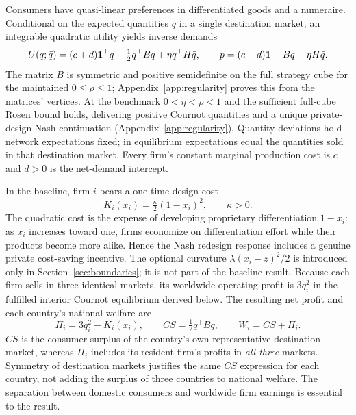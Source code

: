 \documentclass[11pt,a4paper]{article}
\theoremstyle{remark}\newtheorem{remark}[theorem]{Remark}
\begin{document}
Consumers have quasi-linear preferences in differentiated goods and a numeraire. Conditional on the expected quantities $\bar q$ in a single destination market, an integrable quadratic utility yields inverse demands
\begin{equation}\label{eq:consumer}
U(q;\bar q)=(c+d)\boldsymbol{1}^{\top}q-\tfrac12q^{\top}Bq+\eta q^{\top}H\bar q,\qquad
p=(c+d)\boldsymbol{1}-Bq+\eta H\bar q.
\end{equation}
The matrix $B$ is symmetric and positive semidefinite on the full strategy cube for the maintained $0\le\rho\le1$; Appendix~\ref{app:regularity} proves this from the matrices' vertices. At the benchmark $0<\eta<\rho<1$ and the sufficient full-cube Rosen bound holds, delivering positive Cournot quantities and a unique private-design Nash continuation (Appendix~\ref{app:regularity}). Quantity deviations hold network expectations fixed; in equilibrium expectations equal the quantities sold in that destination market. Every firm's constant marginal production cost is $c$ and $d>0$ is the net-demand intercept.

In the baseline, firm $i$ bears a one-time design cost
\begin{equation}\label{eq:cost}
K_i(x_i)=\tfrac{\kappa}{2}(1-x_i)^2,\qquad\kappa>0.
\end{equation}
The quadratic cost is the expense of developing proprietary differentiation $1-x_i$: as $x_i$ increases toward one, firms economize on differentiation effort while their products become more alike. Hence the Nash redesign response includes a genuine private cost-saving incentive. The optional curvature $\lambda(x_i-z)^2/2$ is introduced only in Section~\ref{sec:boundaries}; it is not part of the baseline result. Because each firm sells in three identical markets, its worldwide operating profit is $3q_i^2$ in the fulfilled interior Cournot equilibrium derived below. The resulting net profit and each country's national welfare are
\begin{equation}\label{eq:welfare}
\Pi_i=3q_i^2-K_i(x_i),\qquad CS=\tfrac12q^{\top}Bq,\qquad W_i=CS+\Pi_i.
\end{equation}
$CS$ is the consumer surplus of the country's own representative destination market, whereas $\Pi_i$ includes its resident firm's profits in \emph{all three} markets. Symmetry of destination markets justifies the same $CS$ expression for each country, not adding the surplus of three countries to national welfare. The separation between domestic consumers and worldwide firm earnings is essential to the result.
\end{document}

